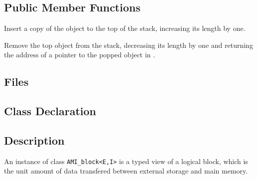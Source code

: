 \subsection{Public Member Functions}
   \btabb 

       {Insert a copy of the
      object  to the top of the stack, increasing its length by
      one.}

        {Remove the top object from
       the stack, decreasing its length by one and returning the address of
       a pointer to the popped object in .}

   \etabb



\subsection{Files}
  \btabb
	 {}
  \etabb

\subsection{Class Declaration}
   \btabb

   \etabb

\subsection{Description}

An instance of class {\tt AMI\_block<E,I>} is a typed
view of a logical block, which is the unit amount of data transfered
between external storage and main memory. 

